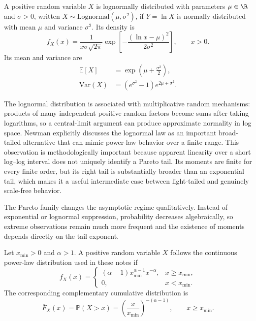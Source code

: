 \begin{definition}
A positive random variable $X$ is lognormally distributed with parameters $\mu\in\R$ and $\sigma>0$, written $X\sim\mathrm{Lognormal}(\mu,\sigma^2)$, if $Y=\ln X$ is normally distributed with mean $\mu$ and variance $\sigma^2$. Its density is
\begin{equation}
 f_X(x)=\frac{1}{x\sigma\sqrt{2\pi}}
 \exp\left[-\frac{(\ln x-\mu)^2}{2\sigma^2}\right],
 \qquad x>0.
\end{equation}
Its mean and variance are
\begin{align}
 \mathbb{E}[X] &= \exp\left(\mu+\frac{\sigma^2}{2}\right),\\
 \mathrm{Var}(X) &= \left(e^{\sigma^2}-1\right)e^{2\mu+\sigma^2}.
\end{align}
\end{definition}

The lognormal distribution is associated with multiplicative random mechanisms: products of many independent positive random factors become sums after taking logarithms, so a central-limit argument can produce approximate normality in log space. Newman \cite{Newman2005} explicitly discusses the lognormal law as an important broad-tailed alternative that can mimic power-law behavior over a finite range. This observation is methodologically important because apparent linearity over a short log--log interval does not uniquely identify a Pareto tail. Its moments are finite for every finite order, but its right tail is substantially broader than an exponential tail, which makes it a useful intermediate case between light-tailed and genuinely scale-free behavior.

The Pareto family changes the asymptotic regime qualitatively. Instead of exponential or lognormal suppression, probability decreases algebraically, so extreme observations remain much more frequent and the existence of moments depends directly on the tail exponent.

\begin{definition}
Let $x_{\min}>0$ and $\alpha>1$. A positive random variable $X$ follows the continuous power-law distribution used in these notes if
\begin{equation}
 f_X(x)=
 \begin{cases}
 (\alpha-1)x_{\min}^{\alpha-1}x^{-\alpha}, & x\geq x_{\min},\\
 0, & x<x_{\min}.
 \end{cases}
\label{eq:pareto-pdf}
\end{equation}
The corresponding complementary cumulative distribution is
\begin{equation}
 \overline F_X(x)=\mathbb{P}(X>x)
 =\left(\frac{x}{x_{\min}}\right)^{-(\alpha-1)},
 \qquad x\geq x_{\min}.
\label{eq:pareto-ccdf}
\end{equation}
\end{definition}

